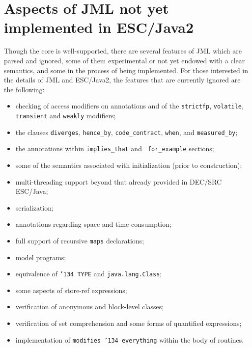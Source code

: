\documentclass{sig-alternate}
\begin{document}
%
%


\appendix
\section{Aspects of JML not yet\\implemented in ESC/Java2}

Though the core is well-supported, there are several features of JML
which are parsed and ignored, some of them experimental or not yet
endowed with a clear semantics, and some in the process of being
implemented.  For those interested in the details of JML and
ESC/Java2, the features that are currently ignored are the following:
\setlength{\partopsep}{0in}\setlength{\parskip}{0in}\setlength{\itemsep}{0in}\setlength{\topsep}{0in}
\begin{itemize}
\setlength{\partopsep}{0in}\setlength{\parskip}{0in}\setlength{\itemsep}{0in}\setlength{\topsep}{0in}
\item checking of access modifiers on annotations and of the
 \texttt{strictfp}, \texttt{volatile},
  \texttt{transient} and \texttt{weakly} modifiers;
\item the clauses \texttt{diverges}, \texttt{hence\_by},
  \texttt{code\_contract}, \texttt{when}, and \texttt{measured\_by};
\item the annotations within \texttt{implies\_that} and {\tt
    for\_example} sections;
\item some of the semantics associated with initialization (prior to
  construction);
\item multi-threading support beyond that already provided in DEC/SRC ESC/\-Java;
\item serialization;
\item annotations regarding space and time consumption;
\item full support of recursive \texttt{maps} declarations;
\item model programs;
\item equivalence of \texttt{\char'134 TYPE} and \texttt{java.lang.Class};
\item some aspects of store-ref expressions;
\item verification of anonymous and block-level classes;
\item verification of set comprehension and some forms of quantified
  expressions;
\item implementation of \texttt{modifies \char'134 everything} within
  the body of routines.
\end{itemize}


\end{document}
